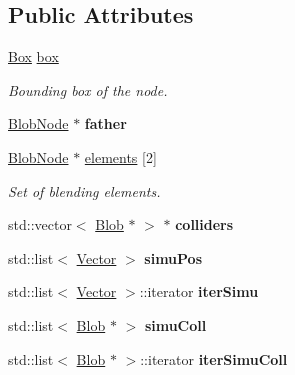 \subsection*{Public Attributes}
\begin{DoxyCompactItemize}
\item 
\hypertarget{class_blob_node_acbd69dfaa0254d52401d3ea0dd2dd8d2}{
\hyperlink{class_box}{Box} \hyperlink{class_blob_node_acbd69dfaa0254d52401d3ea0dd2dd8d2}{box}}
\label{class_blob_node_acbd69dfaa0254d52401d3ea0dd2dd8d2}

\begin{DoxyCompactList}\small\item\em Bounding box of the node. \item\end{DoxyCompactList}\item 
\hypertarget{class_blob_node_a2649ffcd4f77895252968e9babe7a635}{
\hyperlink{class_blob_node}{BlobNode} $\ast$ {\bfseries father}}
\label{class_blob_node_a2649ffcd4f77895252968e9babe7a635}

\item 
\hypertarget{class_blob_node_a38cbfac33ffc463459bad114bd7464fd}{
\hyperlink{class_blob_node}{BlobNode} $\ast$ \hyperlink{class_blob_node_a38cbfac33ffc463459bad114bd7464fd}{elements} \mbox{[}2\mbox{]}}
\label{class_blob_node_a38cbfac33ffc463459bad114bd7464fd}

\begin{DoxyCompactList}\small\item\em Set of blending elements. \item\end{DoxyCompactList}\item 
\hypertarget{class_blob_node_a126c34f1189c5e50413eb59e550e90f4}{
std::vector$<$ \hyperlink{class_blob}{Blob} $\ast$ $>$ $\ast$ {\bfseries colliders}}
\label{class_blob_node_a126c34f1189c5e50413eb59e550e90f4}

\item 
\hypertarget{class_blob_node_a94d44b9f5031082be810cbdae4429f6e}{
std::list$<$ \hyperlink{class_vector}{Vector} $>$ {\bfseries simuPos}}
\label{class_blob_node_a94d44b9f5031082be810cbdae4429f6e}

\item 
\hypertarget{class_blob_node_ac35248fa9bc1df6fbc0939a37cb878da}{
std::list$<$ \hyperlink{class_vector}{Vector} $>$::iterator {\bfseries iterSimu}}
\label{class_blob_node_ac35248fa9bc1df6fbc0939a37cb878da}

\item 
\hypertarget{class_blob_node_aad3ad6d76175c1fb9543dcb4cae6acac}{
std::list$<$ \hyperlink{class_blob}{Blob} $\ast$ $>$ {\bfseries simuColl}}
\label{class_blob_node_aad3ad6d76175c1fb9543dcb4cae6acac}

\item 
\hypertarget{class_blob_node_a9c4171c767323f4148d61e6445728d2f}{
std::list$<$ \hyperlink{class_blob}{Blob} $\ast$ $>$::iterator {\bfseries iterSimuColl}}
\label{class_blob_node_a9c4171c767323f4148d61e6445728d2f}

\end{DoxyCompactItemize}


